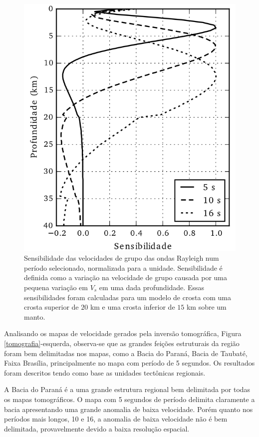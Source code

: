 \begin{figure}[!ht]
\centering
\includegraphics[scale=1]{Figs/sensibilidade.png}
\caption[Sensibilidade das velocidades de grupo das ondas Rayleigh num período selecionado]{Sensibilidade das velocidades de grupo das ondas Rayleigh num período selecionado, normalizada para a unidade. Sensibilidade é definida como a variação na velocidade de grupo causada por uma pequena variação em $V_{s}$ em uma dada profundidade. Essas sensibilidades foram calculadas para um modelo de crosta com uma crosta superior de $20$ km e uma crosta inferior de $15$ km sobre um manto.}
\label{sensibilidade}
\end{figure}

Analisando os mapas de velocidade gerados pela inversão tomográfica, Figura \ref{tomografia}-esquerda, observa-se que as grandes feições estruturais da região foram bem delimitadas nos mapas, como a Bacia do Paraná, Bacia de Taubaté, Faixa Brasília, principalmente no mapa com período de 5 segundos. Os resultados foram descritos tendo como base as unidades tectônicas regionais.

A Bacia do Paraná é a uma grande estrutura regional bem delimitada por todas os mapas tomográficos. O mapa com 5 segundos de período delimita claramente a bacia apresentando uma grande anomalia de baixa velocidade. Porém quanto nos períodos mais longos, 10 e 16, a anomalia de baixa velocidade não é bem delimitada, provavelmente devido a baixa resolução espacial. 

